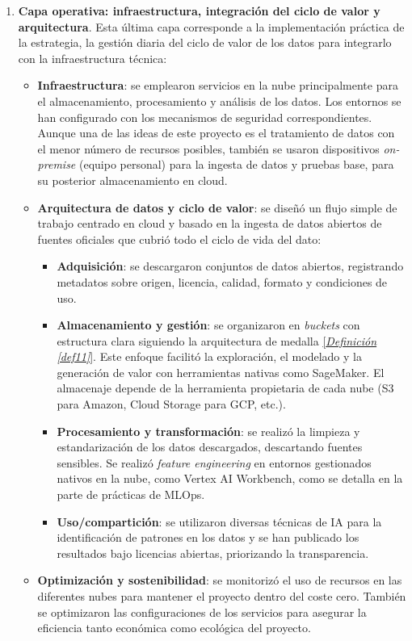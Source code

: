 \begin{enumerate}
	\item \textbf{Capa operativa: infraestructura, integración del ciclo de valor y arquitectura}. Esta última capa corresponde a la implementación práctica de la estrategia, la gestión diaria del ciclo de valor de los datos para integrarlo con la infraestructura técnica:
	\begin{itemize}
		\item \textbf{Infraestructura}: se emplearon servicios en la nube principalmente para el almacenamiento, procesamiento y análisis de los datos. Los entornos se han configurado con los mecanismos de seguridad correspondientes. Aunque una de las ideas de este proyecto es el tratamiento de datos con el menor número de recursos posibles, también se usaron dispositivos \textit{on-premise} (equipo personal) para la ingesta de datos y pruebas base, para su posterior almacenamiento en cloud.
		\item \textbf{Arquitectura de datos y ciclo de valor}: se diseñó un flujo simple de trabajo centrado en cloud y basado en la ingesta de datos abiertos de fuentes oficiales que cubrió todo el ciclo de vida del dato:
		\begin{itemize}
			\item \textbf{Adquisición}: se descargaron conjuntos de datos abiertos, registrando metadatos sobre origen, licencia, calidad, formato y condiciones de uso.
			\item \textbf{Almacenamiento y gestión}: se organizaron en \textit{buckets} con estructura clara siguiendo la arquitectura de medalla \hyperref[def11]{[\textit{Definición \ref*{def11}}]}. Este enfoque facilitó la exploración, el modelado y la generación de valor con herramientas nativas como SageMaker. El almacenaje depende de la herramienta propietaria de cada nube (S3 para Amazon, Cloud Storage para GCP, etc.).
			\item \textbf{Procesamiento y transformación}: se realizó la limpieza y estandarización de los datos descargados, descartando fuentes sensibles. Se realizó \textit{feature engineering} en entornos gestionados nativos en la nube, como Vertex AI Workbench, como se detalla en la parte de prácticas de MLOps.
			\item \textbf{Uso/compartición}: se utilizaron diversas técnicas de IA para la identificación de patrones en los datos y se han publicado los resultados bajo licencias abiertas, priorizando la transparencia.
		\end{itemize}
		\item \textbf{Optimización y sostenibilidad}: se monitorizó el uso de recursos en las diferentes nubes para mantener el proyecto dentro del coste cero. También se optimizaron las configuraciones de los servicios para asegurar la eficiencia tanto económica como ecológica del proyecto.
	\end{itemize}
\end{enumerate}

